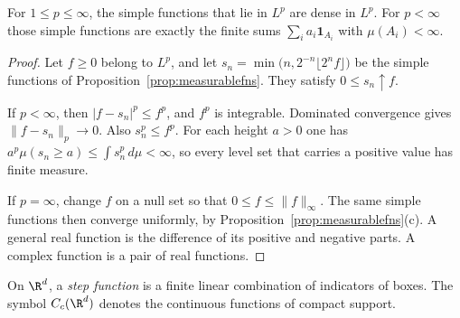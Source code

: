 \begin{proposition}\label{prop:simpledense}
For $1\le p\le\infty$, the simple functions that lie in $L^p$ are dense in $L^p$. For $p<\infty$ those simple functions are exactly the finite sums $\sum_ia_i\mathbf 1_{A_i}$ with $\mu(A_i)<\infty$.
\end{proposition}
\begin{proof}
Let $f\ge0$ belong to $L^p$, and let $s_n=\min\bigl(n,2^{-n}\lfloor 2^n f\rfloor\bigr)$ be the simple functions of Proposition~\ref{prop:measurablefns}. They satisfy $0\le s_n\uparrow f$.

If $p<\infty$, then $|f-s_n|^p\le f^p$, and $f^p$ is integrable. Dominated convergence gives $\|f-s_n\|_p\to0$. Also $s_n^p\le f^p$. For each height $a>0$ one has $a^p\mu(s_n\ge a)\le\int s_n^p\,d\mu<\infty$, so every level set that carries a positive value has finite measure.

If $p=\infty$, change $f$ on a null set so that $0\le f\le\|f\|_\infty$. The same simple functions then converge uniformly, by Proposition~\ref{prop:measurablefns}(c). A general real function is the difference of its positive and negative parts. A complex function is a pair of real functions.
\end{proof}

On $\R^d$, a \emph{step function} is a finite linear combination of indicators of boxes. The symbol $C_c(\R^d)$ denotes the continuous functions of compact support.

